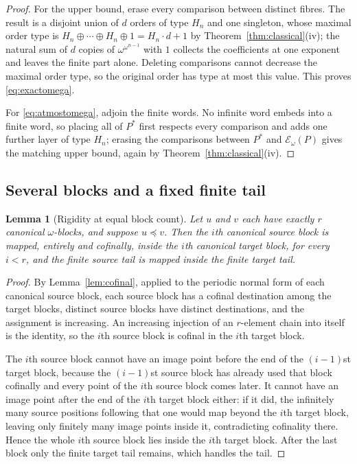 \documentclass[11pt,a4paper]{article}
\numberwithin{equation}{section}
\newtheorem{lemma}[theorem]{Lemma}
\theoremstyle{definition}
\theoremstyle{remark}
\newcommand{\emb}{\preccurlyeq}
\newcommand{\Hn}[1]{H_{#1}}
\newcommand{\E}{\mathcal E}
\begin{document}
\begin{proof}
For the upper bound, erase every comparison between distinct fibres. The
result is a disjoint union of $d$ orders of type $\Hn n$ and one singleton,
whose maximal order type is
$\Hn n\oplus\cdots\oplus\Hn n\oplus1=\Hn n\cdot d+1$ by
Theorem~\ref{thm:classical}(iv); the natural sum of $d$ copies of
$\omega^{\omega^{n-1}}$ with $1$ collects the coefficients at one exponent and
leaves the finite part alone. Deleting comparisons cannot decrease the
maximal order type, so the original order has type at most this value. This
proves \eqref{eq:exactomega}.

For \eqref{eq:atmostomega}, adjoin the finite words. No infinite word embeds
into a finite word, so placing all of $P^*$ first respects every comparison
and adds one further layer of type $\Hn n$; erasing the comparisons between
$P^*$ and $\E_\omega(P)$ gives the matching upper bound, again by
Theorem~\ref{thm:classical}(iv).
\end{proof}

\subsection{Several blocks and a fixed finite tail}

\begin{lemma}[Rigidity at equal block count]\label{lem:equalblocks}
Let $u$ and $v$ each have exactly $r$ canonical $\omega$-blocks, and suppose
$u\emb v$. Then the $i$th canonical source block is mapped, entirely and
cofinally, inside the $i$th canonical target block, for every $i<r$, and the
finite source tail is mapped inside the finite target tail.
\end{lemma}
\begin{proof}
By Lemma~\ref{lem:cofinal}, applied to the periodic normal form of each
canonical source block, each source block has a cofinal destination among the
target blocks, distinct source blocks have distinct destinations, and the
assignment is increasing. An increasing injection of an $r$-element chain into
itself is the identity, so the $i$th source block is cofinal in the $i$th
target block.

The $i$th source block cannot have an image point before the end of the
$(i-1)$st target block, because the $(i-1)$st source block has already used
that block cofinally and every point of the $i$th source block comes later.
It cannot have an image point after the end of the $i$th target block either:
if it did, the infinitely many source positions following that one would map
beyond the $i$th target block, leaving only finitely many image points inside
it, contradicting cofinality there. Hence the whole $i$th source block lies
inside the $i$th target block. After the last block only the finite target
tail remains, which handles the tail.
\end{proof}
\end{document}
